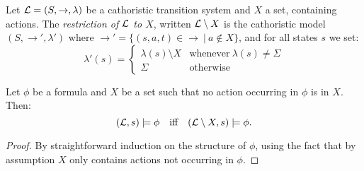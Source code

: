 

\begin{definition}
Let $\mathcal{L} = (S, \rightarrow, \lambda)$ be a cathoristic transition system
and $X$ a set, containing actions. The \emph{restriction of
  $\mathcal{L}$ to $X$}, written $\mathcal{L} \setminus X$ is the cathoristic model $(S,
\rightarrow', \lambda')$ where $\rightarrow' = \{(s, a, t) \in
\rightarrow \ |\ a \notin X\}$, and for all states $s$ we set:
\[
   \lambda'(s) 
        =
   \begin{cases}
       \lambda(s) \setminus  X & \text{whenever}\ \lambda(s) \neq \Sigma \\
       \Sigma & \text{otherwise}
   \end{cases}
\]

\end{definition}

\begin{lemma}\label{compactness:lemma:1717}
Let $\phi$ be a \cathoristic{} formula and $X$ be a set such that no action
occurring in $\phi$ is in $X$. Then:
\[
   (\mathcal{L}, s) \models \phi
      \quad\text{iff}\quad
   (\mathcal{L} \setminus X, s) \models \phi.
\]
\end{lemma}
\begin{proof}
By straightforward induction on the structure of $\phi$, using the
fact that by assumption $X$ only contains actions not occurring in
$\phi$.  
\end{proof}

